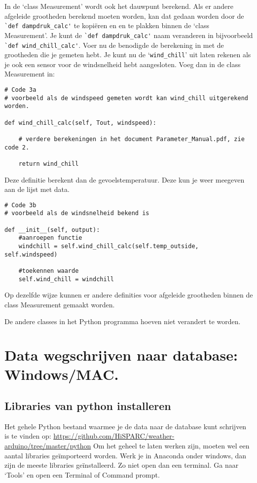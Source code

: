 In de `class Measurement' wordt ook het dauwpunt berekend. Als er andere
afgeleide grootheden berekend moeten worden, kan dat gedaan worden door
de \verb|`def dampdruk_calc'| te kopiëren en en te plakken binnen de
`class Measurement'. Je kunt de \verb|`def dampdruk_calc'| naam veranderen in
bijvoorbeeld \verb|`def wind_chill_calc'|. Voer nu de benodigde de berekening in
met de grootheden die je gemeten hebt. Je kunt nu de
`\verb|wind_chill|' uit laten rekenen als je ook een sensor voor de
windsnelheid hebt aangesloten. Voeg dan in de class Measurement in:

\begin{verbatim}
# Code 3a
# voorbeeld als de windspeed gemeten wordt kan wind_chill uitgerekend worden.

def wind_chill_calc(self, Tout, windspeed):

    # verdere berekeningen in het document Parameter_Manual.pdf, zie code 2.

    return wind_chill

\end{verbatim}

Deze definitie berekent dan de gevoelstemperatuur. Deze kun je weer meegeven aan
de lijst met data.

\begin{verbatim}
# Code 3b
# voorbeeld als de windsnelheid bekend is

def __init__(self, output):
    #aanroepen functie
    windchill = self.wind_chill_calc(self.temp_outside, self.windspeed)

    #toekennen waarde
    self.wind_chill = windchill

\end{verbatim}

Op dezelfde wijze kunnen er andere definities voor afgeleide grootheden
binnen de class Measurement gemaakt worden.

De andere classes in het Python programma hoeven niet verandert te worden.

\section{Data wegschrijven naar \hisparc database: Windows/MAC.}


\subsection{Libraries van python installeren}

Het gehele Python bestand waarmee je de data naar de \hisparc database kunt schrijven
is te vinden op:
\url{https://github.com/HiSPARC/weather-arduino/tree/master/python}
Om het geheel te laten werken zijn, moeten wel een aantal libraries geïmporteerd worden.
Werk je in Anaconda onder windows, dan zijn de meeste libraries geïnstalleerd.
Zo niet open dan een terminal. Ga naar `Tools' en open een Terminal of Command prompt.


